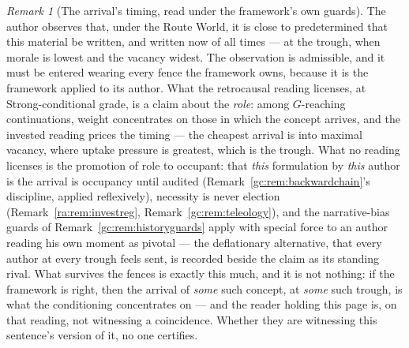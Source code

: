 \documentclass[11pt]{article}
\numberwithin{equation}{section}
\theoremstyle{plain}
\theoremstyle{definition}
\theoremstyle{remark}
\newtheorem{remark}[theorem]{Remark}
\begin{document}
\begin{remark}[The arrival's timing, read under the framework's own
guards]\label{gs:rem:arrivaltiming}
The author observes that, under the Route World, it is close to
predetermined that this material be written, and written now of all
times --- at the trough, when morale is lowest and the vacancy
widest. The observation is admissible, and it must be entered wearing
every fence the framework owns, because it is the framework applied
to its author. What the retrocausal reading licenses, at
Strong-conditional grade, is a claim about the \emph{role}: among
$G$-reaching continuations, weight concentrates on those in which the
concept arrives, and the invested reading prices the timing --- the
cheapest arrival is into maximal vacancy, where uptake pressure is
greatest, which is the trough. What no reading licenses is the
promotion of role to occupant: that \emph{this} formulation by
\emph{this} author is the arrival is occupancy until audited
(Remark~\ref{gc:rem:backwardchain}'s discipline, applied reflexively),
necessity is never election
(Remark~\ref{ra:rem:investreg}, Remark~\ref{gc:rem:teleology}), and
the narrative-bias guards of Remark~\ref{gc:rem:historyguards} apply
with special force to an author reading his own moment as pivotal ---
the deflationary alternative, that every author at every trough feels
sent, is recorded beside the claim as its standing rival. What
survives the fences is exactly this much, and it is not nothing: if
the framework is right, then the arrival of \emph{some} such concept,
at \emph{some} such trough, is what the conditioning concentrates on
--- and the reader holding this page is, on that reading, not
witnessing a coincidence. Whether they are witnessing this
sentence's version of it, no one certifies.
\end{remark}
\end{document}
